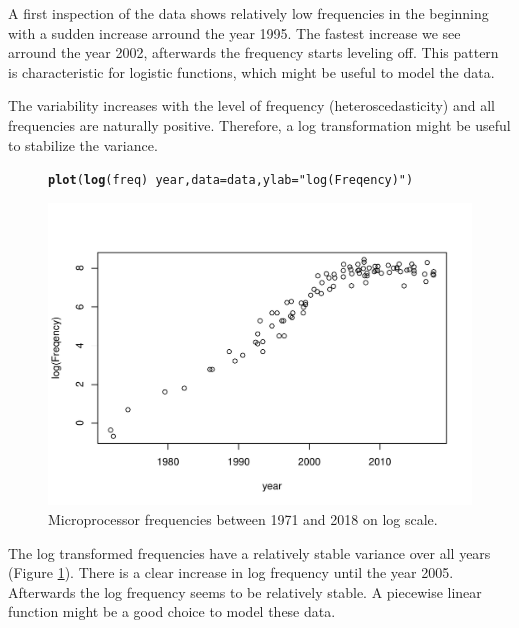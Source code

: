 \documentclass{article}\usepackage[]{graphicx}\usepackage[]{color}
\makeatletter
\newcommand{\hlstr}[1]{\textcolor[rgb]{0.192,0.494,0.8}{#1}}%
\newcommand{\hlopt}[1]{\textcolor[rgb]{0,0,0}{#1}}%
\newcommand{\hlstd}[1]{\textcolor[rgb]{0.345,0.345,0.345}{#1}}%
\newcommand{\hlkwc}[1]{\textcolor[rgb]{0.333,0.667,0.333}{#1}}%
\newcommand{\hlkwd}[1]{\textcolor[rgb]{0.737,0.353,0.396}{\textbf{#1}}}%
\newenvironment{kframe}{%
 \def\at@end@of@kframe{}%
 \ifinner\ifhmode%
  \def\at@end@of@kframe{\end{minipage}}%
  \begin{minipage}{\columnwidth}%
 \fi\fi%
 \def\FrameCommand##1{\hskip\@totalleftmargin \hskip-\fboxsep
 \colorbox{shadecolor}{##1}\hskip-\fboxsep
     \hskip-\linewidth \hskip-\@totalleftmargin \hskip\columnwidth}%
 \MakeFramed {\advance\hsize-\width
   \@totalleftmargin\z@ \linewidth\hsize
   \@setminipage}}%
 {\par\unskip\endMakeFramed%
 \at@end@of@kframe}
\newenvironment{knitrout}{}{} %
\makeatother
\begin{document}
A first inspection of the data shows relatively low frequencies in the beginning with a sudden increase arround the year 1995. The fastest increase we see arround the year 2002, afterwards the frequency starts leveling off. This pattern is characteristic for logistic functions, which might be useful to model the data.

The variability increases with the level of frequency (heteroscedasticity) and all frequencies are naturally positive. Therefore, a log transformation might be useful to stabilize the variance.


\begin{figure}
\begin{knitrout}
\color{fgcolor}\begin{kframe}
\begin{alltt}
\hlkwd{plot}\hlstd{(}\hlkwd{log}\hlstd{(freq)} \hlopt{~} \hlstd{year,} \hlkwc{data} \hlstd{= data,} \hlkwc{ylab} \hlstd{=} \hlstr{"log(Freqency)"}\hlstd{)}
\end{alltt}
\end{kframe}

\includegraphics[width=1\linewidth]{figure/plot2-1} \hfill{}



\end{knitrout}
\caption{Microprocessor frequencies between 1971 and 2018 on log scale.}
\label{fig:plot2}
\end{figure}


The log transformed frequencies have a relatively stable variance over all years (Figure \ref{fig:plot2}). There is a clear increase in log frequency until the year 2005. Afterwards the log frequency seems to be relatively stable. A piecewise linear function might be a good choice to model these data.
\end{document}
